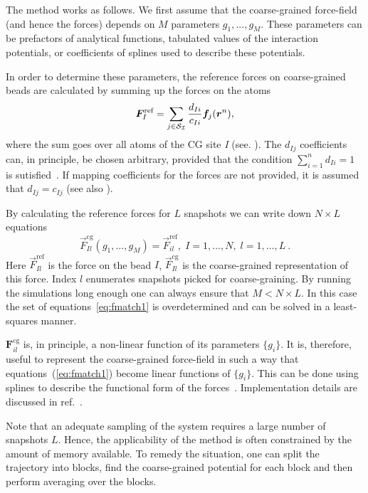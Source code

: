 The method works as follows. We first assume that the coarse-grained force-field (and hence the forces) depends on $M$ parameters $g_1,...,g_M $. These parameters can be prefactors of analytical functions, tabulated values of the interaction potentials, or coefficients of splines used to describe these potentials.

In order to determine these parameters, the reference forces on coarse-grained beads are calculated by summing up the forces on the atoms
\begin{equation}
  {\vec F}_I^\text{ref} = \sum_{j \in {\cal S_I}} \frac{d_{Ii}}{c_{Ii}} {\vec f}_j({\vec r^n}),
  \label{eq:force_mapping}
\end{equation}
where the sum goes over all atoms of the CG site {\it I} (see. ).
The $d_{Ij}$ coefficients can, in principle, be chosen arbitrary, provided that the condition $ \sum_{i=1}^{n}d_{Ii}=1$ is sutisfied~\cite{Noid:2008.1}. If mapping coefficients for the forces are not provided, it is assumed that $d_{Ij} = c_{Ij}$ (see also ).

By calculating the reference forces for $L$ snapshots we can write down $N \times L$ equations
%
\begin{equation}
  {\vec F}_{Il}^\text{cg}(g_1, \dots ,g_M)=\vec F_{il}^\text{ref},\;
  I=1,\dots,N,\; l=1,\dots,L~.
  \label{eq:fmatch1}
\end{equation}
%
Here ${\vec F}_{Il}^\text{ref}$ is the force on the bead $I$, ${\vec F}_{Il}^\text{cg} $ is the coarse-grained representation of this force. Index $l$ enumerates snapshots picked for coarse-graining. By running the simulations long enough one can always ensure that $M < N \times L$. In this case the set of equations~\ref{eq:fmatch1} is overdetermined and can be solved in a least-squares manner.

${\bm F}_{il}^\text{cg}$ is, in principle, a non-linear function of its parameters $\{g_i\}$. It is, therefore, useful to represent the coarse-grained force-field in such a way that equations~(\ref{eq:fmatch1}) become linear functions of $\{g_i\}$. This can be done using splines to describe the functional form of the forces~\cite{Izvekov:2005}. Implementation details are discussed in ref.~\cite{Ruehle:2009.a}.

Note that an adequate sampling of the system requires a large number of snapshots $L$. Hence, the applicability of the method is often constrained by the amount of memory available. To remedy the situation, one can split the trajectory into blocks, find the coarse-grained potential for each block and then perform averaging over the blocks.
